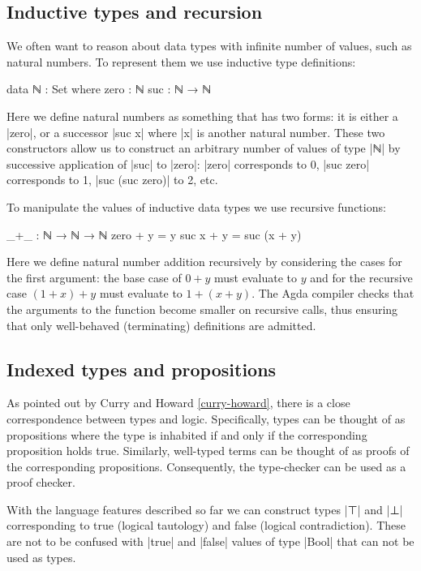 \subsection{Inductive types and recursion}

We often want to reason about data types with infinite number of values, such as natural numbers.
To represent them we use inductive type definitions:

\begin{code}
data ℕ : Set where
  zero : ℕ
  suc : ℕ → ℕ
\end{code}

Here we define natural numbers as something that has two forms: it is either a |zero|, or a successor |suc x| where |x| is another natural number. These two constructors allow us to construct an arbitrary number of values of type |ℕ| by successive application of |suc| to |zero|: |zero| corresponds to 0, |suc zero| corresponds to 1, |suc (suc zero)| to 2, etc.

To manipulate the values of inductive data types we use recursive functions:

\begin{code}
_+_ : ℕ → ℕ → ℕ
zero + y = y
suc x + y = suc (x + y)
\end{code}

Here we define natural number addition recursively by considering the cases for the first argument: the base case of $0 + y$ must evaluate to $y$ and for the recursive case $(1 + x) + y$ must evaluate to $1 + (x + y)$. The Agda compiler checks that the arguments to the function become smaller on recursive calls, thus ensuring that only well-behaved (terminating) definitions are admitted.

\subsection{Indexed types and propositions}

As pointed out by Curry and Howard \ref{curry-howard}, there is a close correspondence between types and
logic. Specifically, types can be thought of as propositions where the type is inhabited if and only 
if the corresponding proposition holds true. Similarly, well-typed terms can be thought of as proofs 
of the corresponding propositions. Consequently, the type-checker can be used as a proof checker.

With the language features described so far we can construct types |⊤| and |⊥| corresponding to true (logical tautology) and false (logical contradiction). These are not to be confused with |true| and |false| values of type |Bool| that can not be used as types.

